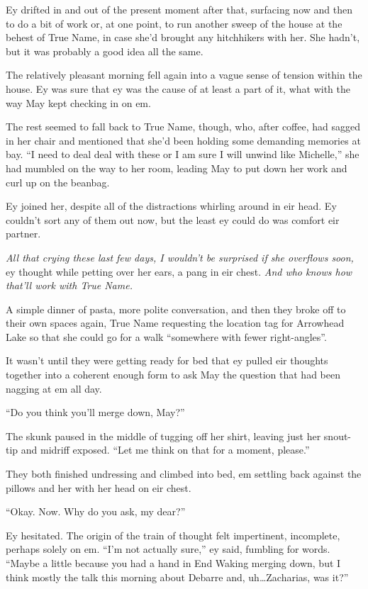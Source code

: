 Ey drifted in and out of the present moment after that, surfacing now and then to do a bit of work or, at one point, to run another sweep of the house at the behest of True Name, in case she'd brought any hitchhikers with her. She hadn't, but it was probably a good idea all the same.

The relatively pleasant morning fell again into a vague sense of tension within the house. Ey was sure that ey was the cause of at least a part of it, what with the way May kept checking in on em.

The rest seemed to fall back to True Name, though, who, after coffee, had sagged in her chair and mentioned that she'd been holding some demanding memories at bay. ``I need to deal deal with these or I am sure I will unwind like Michelle,'' she had mumbled on the way to her room, leading May to put down her work and curl up on the beanbag.

Ey joined her, despite all of the distractions whirling around in eir head. Ey couldn't sort any of them out now, but the least ey could do was comfort eir partner.

\emph{All that crying these last few days, I wouldn't be surprised if she overflows soon,} ey thought while petting over her ears, a pang in eir chest. \emph{And who knows how that'll work with True Name.}

A simple dinner of pasta, more polite conversation, and then they broke off to their own spaces again, True Name requesting the location tag for Arrowhead Lake so that she could go for a walk ``somewhere with fewer right-angles''.

It wasn't until they were getting ready for bed that ey pulled eir thoughts together into a coherent enough form to ask May the question that had been nagging at em all day.

``Do you think you'll merge down, May?''

The skunk paused in the middle of tugging off her shirt, leaving just her snout-tip and midriff exposed. ``Let me think on that for a moment, please.''

They both finished undressing and climbed into bed, em settling back against the pillows and her with her head on eir chest.

``Okay. Now. Why do you ask, my dear?''

Ey hesitated. The origin of the train of thought felt impertinent, incomplete, perhaps solely on em. ``I'm not actually sure,'' ey said, fumbling for words. ``Maybe a little because you had a hand in End Waking merging down, but I think mostly the talk this morning about Debarre and, uh\ldots Zacharias, was it?''

